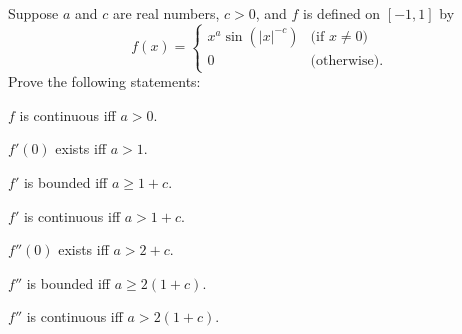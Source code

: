 \documentclass{assignment}
\begin{document}
\begin{question}[5.13]
 Suppose $a$ and $c$ are real numbers, $c > 0$, and $f$ is defined on $[-1, 1]$ by 
$$f(x) = \begin{cases} x^a \sin(|x|^{-c}) &\text{(if $x\neq 0$)} \\ 0 &\text{(otherwise).}
\end{cases}$$ Prove the following statements:
\begin{qparts}
  \item $f$ is continuous iff $a > 0$.
  \item $f'(0)$ exists iff $a > 1$.
  \item $f'$ is bounded iff $a \geq 1 + c$.
  \item $f'$ is continuous iff $a > 1 + c$.
  \item $f''(0)$ exists iff $a > 2 + c$.
  \item $f''$ is bounded iff $a \geq 2(1 + c)$. 
  \item $f''$ is continuous iff $a > 2(1 + c)$.
\end{qparts}
\end{question}
\end{document}
